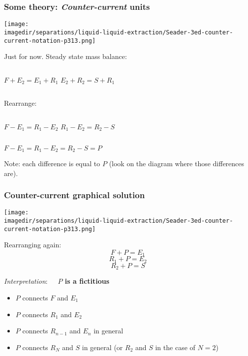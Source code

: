 \begin{frame}\frametitle{Some theory: \emph{Counter-current} units}
	\begin{center}
		\texttt{[image: \\imagedir/separations/liquid-liquid-extraction/Seader-3ed-counter-current-notation-p313.png]}
	\end{center}
	Just \textbf{{\color{myGreen}{consider $N=2$ stages}}} for now. Steady state mass balance:
	\begin{center}
		\begin{columns}[t]
				$F + E_2 = E_1 + R_1$
				$E_2 + R_2 = S + R_1$
		\end{columns}
	\end{center}
	Rearrange:
	\begin{center}		
		\begin{columns}[t]
				$F - E_1 = R_1 - E_2$
				$R_1 - E_2 = R_2 - S$
		\end{columns}
		\vspace{12pt}
		$F - E_1  =  R_1 - E_2 = R_2 - S = P$
	\end{center}
	Note: each difference is equal to $P$ (look on the diagram where those differences are).
\end{frame}

\begin{frame}\frametitle{Counter-current graphical solution}
	\begin{center}
		\texttt{[image: \\imagedir/separations/liquid-liquid-extraction/Seader-3ed-counter-current-notation-p313.png]}
	\end{center}
	
	\vspace{6pt}
	Rearranging again:
	\[	F + P = E_1 \]
	\[	R_1 + P = E_2 \]
	\[	R_2 + P = S \]
	
	\vspace{6pt}
	\emph{Interpretation}: \textbf{~~$P$ is a fictitious {\color{purple}{operating point}}}
	\vspace{6pt}
	\begin{itemize}
		\item	$P$ connects $F$ and $E_1$ 
		\item	$P$ connects $R_1$ and $E_2$ 
		\item	$P$ connects $R_{n-1}$ and $E_{n}$ in general
		\item	$P$ connects $R_{N}$ and $S$ in general {\scriptsize (or $R_2$ and $S$ in the case of $N=2$)}
	\end{itemize}
\end{frame}

